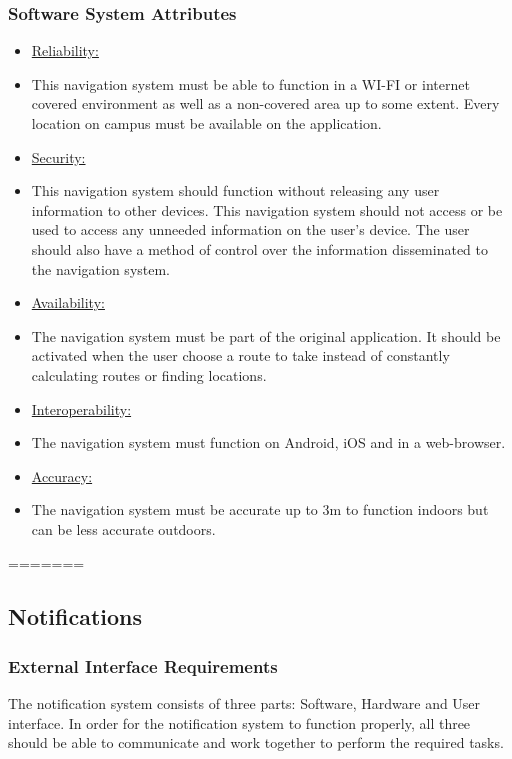 \documentclass[runningheads,a4paper]{article}
\begin{document}
\subsubsection {Software System Attributes}
\begin{itemize}
\item \underline{Reliability:} 
\item This navigation system must be able to function in a WI-FI or internet covered environment as well as a non-covered area up to some extent. Every location on campus must be available on the application. 

\item \underline{Security:}
\item This navigation system should function without releasing any user information to other devices. This navigation system should not access or be used to access any unneeded information on the user’s device. 
The user should also have a method of control over the information disseminated to the navigation system.

\item \underline{Availability:}
\item The navigation system must be part of the original application. It should be activated when the user choose a route to take instead of constantly calculating routes or finding locations. 

\item \underline{Interoperability:}
\item The navigation system must function on Android, iOS and in a web-browser.

\item \underline{Accuracy:}
\item The navigation system must be accurate up to 3m to function indoors but can be less accurate outdoors. 
\end{itemize}

=======
\subsection {Notifications}



\subsubsection{External Interface Requirements}
The notification system consists of three parts: Software, Hardware and User interface. In order for the notification system to function properly, all three should be able to communicate and work together to perform the required tasks. 
\end{document}
